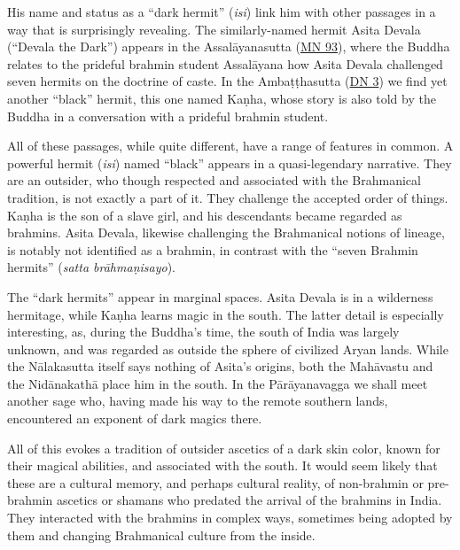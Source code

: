 \documentclass[12pt,openany]{book}%
\begin{document}
His name and status as a “dark hermit” (\textit{isi}) link him with other passages in a way that is surprisingly revealing. The similarly-named hermit Asita Devala (“Devala the Dark”) appears in the \textsanskrit{Assalāyanasutta} (\href{https://suttacentral.net/mn93/en/sujato}{MN 93}), where the Buddha relates to the prideful brahmin student \textsanskrit{Assalāyana} how Asita Devala challenged seven hermits on the doctrine of caste. In the \textsanskrit{Ambaṭṭhasutta} (\href{https://suttacentral.net/dn3/en/sujato}{DN 3}) we find yet another “black” hermit, this one named \textsanskrit{Kaṇha}, whose story is also told by the Buddha in a conversation with a prideful brahmin student.

All of these passages, while quite different, have a range of features in common. A powerful hermit (\textit{isi}) named “black” appears in a quasi-legendary narrative. They are an outsider, who though respected and associated with the Brahmanical tradition, is not exactly a part of it. They challenge the accepted order of things. \textsanskrit{Kaṇha} is the son of a slave girl, and his descendants became regarded as brahmins. Asita Devala, likewise challenging the Brahmanical notions of lineage, is notably not identified as a brahmin, in contrast with the “seven Brahmin hermits” (\textit{satta \textsanskrit{brāhmaṇisayo}}).

The “dark hermits” appear in marginal spaces. Asita Devala is in a wilderness hermitage, while \textsanskrit{Kaṇha} learns magic in the south. The latter detail is especially interesting, as, during the Buddha’s time, the south of India was largely unknown, and was regarded as outside the sphere of civilized Aryan lands. While the \textsanskrit{Nālakasutta} itself says nothing of Asita’s origins, both the \textsanskrit{Mahāvastu} and the \textsanskrit{Nidānakathā} place him in the south. In the \textsanskrit{Pārāyanavagga} we shall meet another sage who, having made his way to the remote southern lands, encountered an exponent of dark magics there.

All of this evokes a tradition of outsider ascetics of a dark skin color, known for their magical abilities, and associated with the south. It would seem likely that these are a cultural memory, and perhaps cultural reality, of non-brahmin or pre-brahmin ascetics or shamans who predated the arrival of the brahmins in India. They interacted with the brahmins in complex ways, sometimes being adopted by them and changing Brahmanical culture from the inside.
\end{document}
